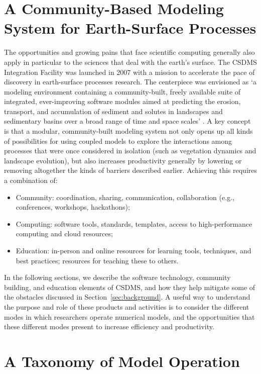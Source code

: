 \documentclass[12pt]{amsart}
\begin{document}
\section{A Community-Based Modeling System for Earth-Surface Processes}
\label{sec:csdms}

The opportunities and growing pains that face scientific computing generally also apply in particular to the sciences that deal with the earth's surface. The CSDMS Integration Facility was launched in 2007 with a mission to accelerate the pace of discovery in earth-surface processes research. The centerpiece was envisioned as `a modeling environment containing a community-built, freely available suite of integrated, ever-improving software modules aimed at predicting the erosion, transport, and accumulation of sediment and solutes in landscapes and sedimentary basins over a broad range of time and space scales' \citep{anderson2004community}. A key concept is that a modular, community-built modeling system not only opens up all kinds of possibilities for using coupled models to explore the interactions among processes that were once considered in isolation (such as vegetation dynamics and landscape evolution), but also increases productivity generally by lowering or removing altogether the kinds of barriers described earlier. Achieving this requires a combination of:
\begin{itemize}
\item
Community: coordination, sharing, communication, collaboration (e.g., conferences, workshops, hackathons);
\item
Computing: software tools, standards, templates, access to high-performance computing and cloud resources;
\item
Education: in-person and online resources for learning tools, techniques, and best practices; resources for teaching these to others.
\end{itemize}
In the following sections, we describe the software technology, community building, and education elements of CSDMS, and how they help mitigate some of the obstacles discussed in Section~\ref{sec:background}. A useful way to understand the purpose and role of these products and activities is to consider the different modes in which researchers operate numerical models, and the opportunities that these different modes present to increase efficiency and productivity.


\section{A Taxonomy of Model Operation}
\label{sec:taxonomy}
\end{document}
